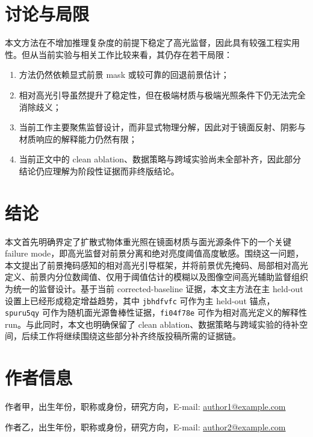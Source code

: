 \documentclass[UTF8,a4paper]{ctexart}
\begin{document}
\section{讨论与局限}

本文方法在不增加推理复杂度的前提下稳定了高光监督，因此具有较强工程实用性。但从当前实验与相关工作比较来看，其仍存在若干局限：

\begin{enumerate}
\item 方法仍然依赖显式前景 mask 或较可靠的回退前景估计；
\item 相对高光引导虽然提升了稳定性，但在极端材质与极端光照条件下仍无法完全消除歧义；
\item 当前工作主要聚焦监督设计，而非显式物理分解，因此对于镜面反射、阴影与材质响应的解释能力仍然有限；
\item 当前正文中的 clean ablation、数据策略与跨域实验尚未全部补齐，因此部分结论仍应理解为阶段性证据而非终版结论。
\end{enumerate}

\section{结论}

本文首先明确界定了扩散式物体重光照在镜面材质与面光源条件下的一个关键 failure mode，即高光监督对前景分离和绝对亮度阈值高度敏感。围绕这一问题，本文提出了前景掩码感知的相对高光引导框架，并将前景优先掩码、局部相对高光定义、前景内分位数阈值、仅用于阈值估计的模糊以及图像空间高光辅助监督组织为统一的监督设计。基于当前 corrected-baseline 证据，本文主方法在主 held-out 设置上已经形成稳定增益趋势，其中 \texttt{jbhdfvfc} 可作为主 held-out 锚点，\texttt{spuru5qy} 可作为随机面光源鲁棒性证据，\texttt{fi04f78e} 可作为相对高光定义的解释性 run。与此同时，本文也明确保留了 clean ablation、数据策略与跨域实验的待补空间，后续工作将继续围绕这些部分补齐终版投稿所需的证据链。

\section*{作者信息}

\noindent 作者甲，出生年份，职称或身份，研究方向，E-mail: \href{mailto:author1@example.com}{author1@example.com}

\noindent 作者乙，出生年份，职称或身份，研究方向，E-mail: \href{mailto:author2@example.com}{author2@example.com}
\end{document}

